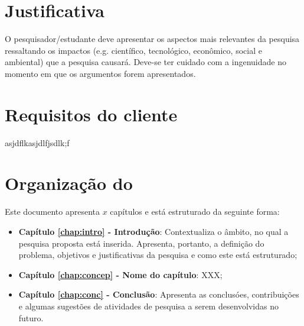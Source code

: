\section{Justificativa}
\label{sec:justi}

O pesquisador/estudante deve apresentar os aspectos mais
relevantes da pesquisa ressaltando os impactos (e.g. cient\'ifico,
tecnol\'ogico, econ\^omico, social e ambiental) que a pesquisa
causar\'a. Deve-se ter cuidado com a ingenuidade no momento em que
os argumentos forem apresentados.

\section{Requisitos do cliente}
\label{sec:reqc}
asjdflkasjdlfjsdlk;f

\section{Organização do \thetypework}
\label{section:organizacao}

Este documento apresenta $x$ capítulos e está estruturado da seguinte forma:

\begin{itemize}

  \item \textbf{Capítulo \ref{chap:intro} - Introdução}: Contextualiza o âmbito, no qual a pesquisa proposta está inserida. Apresenta, portanto, a definição do problema, objetivos e justificativas da pesquisa e como este \thetypeworkthree está estruturado;

  \item \textbf{Capítulo \ref{chap:concep} - Nome do capítulo}: XXX;


  \item \textbf{Capítulo \ref{chap:conc} - Conclusão}: Apresenta as conclusóes, contribuições
  e algumas sugestões de atividades de pesquisa a serem desenvolvidas no futuro.

\end{itemize}
